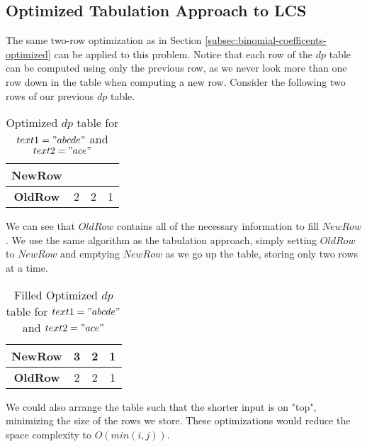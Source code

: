 \subsection{Optimized Tabulation Approach to LCS}\label{subsec:lcs-optimized}
The same two-row optimization as in Section \ref{subsec:binomial-coefficents-optimized} can be applied to this problem.
Notice that each row of the $dp$ table can be computed using only the previous row, as we never look more than one row down in the table when computing a new row.
Consider the following two rows of our previous $dp$ table.
\begin{table}[H]
    \centering
    \begin{tabular}{|c|c|c|c|}
        \hline
        \textbf{NewRow} & $\phantom{0}$ & $\phantom{0}$ & $\phantom{0}$ \\
        \hline
        \textbf{OldRow} & 2 & 2 & 1  \\
        \hline
    \end{tabular}
    \caption{Optimized $dp$ table for $text1="abcde"$ and $text2="ace"$}
\end{table}

We can see that $OldRow$ contains all of the necessary information to fill $NewRow$.
We use the same algorithm as the tabulation approach, simply setting $OldRow$ to $NewRow$ and emptying $NewRow$ as we go up the table,
storing only two rows at a time.

\begin{table}[H]
    \centering
    \begin{tabular}{|c|c|c|c|}
        \hline
        \textbf{NewRow} & 3 & 2 & 1 \\
        \hline
        \textbf{OldRow} & 2 & 2 & 1  \\
        \hline
    \end{tabular}
    \caption{Filled Optimized $dp$ table for $text1="abcde"$ and $text2="ace"$}
\end{table}

We could also arrange the table such that the shorter input is on "top", minimizing the size of the rows we store. These optimizations would reduce the space complexity to $O(min(i,j))$.

\newpage

